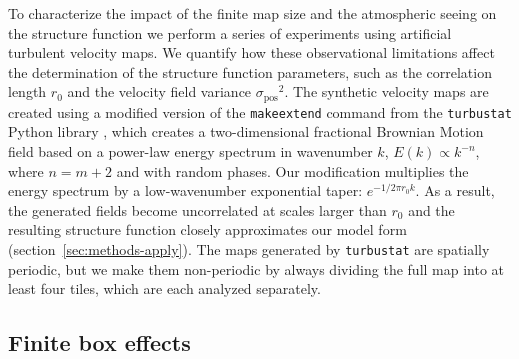 \documentclass[fleqn,usenatbib, useAMS, a4paper]{mnras}
\newcommand\pos{\ensuremath{_{\mathrm{pos}}}}
\begin{document}
To characterize the impact of the finite map size
and the atmospheric seeing on the structure function we perform a series of experiments using artificial turbulent velocity maps.
We quantify how these observational limitations affect the determination of
the structure function parameters, such as
the correlation length \(r_0\) and the velocity field variance \(\sigma\pos^2\). 
The synthetic velocity maps are created using a modified version of the \texttt{make\textunderscore{}extend} command from the \texttt{turbustat} Python library \citep{Koch2019AJ....158....1K},
which creates a two-dimensional fractional Brownian Motion field
\citep{Miville-Deschenes:2003a}
based on a power-law energy spectrum in wavenumber \(k\), \(E(k) \propto k^{-n}\),
where \(n = m + 2\) and with random phases. 
Our modification multiplies the energy spectrum by a
low-wavenumber exponential taper:
\(e^{-1 / 2 \pi r_0 k}\).
As a result, the generated fields become uncorrelated at scales larger than \(r_0\)
and the resulting structure function closely approximates our model form
(section~\ref{sec:methods-apply}).
The maps generated by \texttt{turbustat} are spatially periodic,
but we make them non-periodic by always dividing the full map into at least
four tiles, which are each analyzed separately. 


\subsection{Finite box effects}
\label{sec:finite-box-effects}
\end{document}
